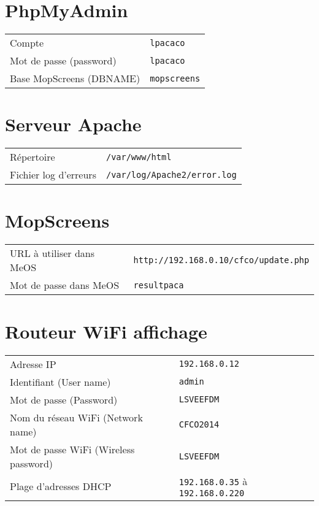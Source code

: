 \documentclass[a4paper]{ffco-rapport}
\begin{document}
\section*{PhpMyAdmin}

\begin{tabular}{l|l}
	Compte & \texttt{lpacaco}\\
	Mot de passe (password) & \texttt{lpacaco}\\
	Base MopScreens (DBNAME) & \texttt{mopscreens}\\
\end{tabular}

\section*{Serveur Apache}

\begin{tabular}{l|l}
	Répertoire & \texttt{/var/www/html}\\
	Fichier log d'erreurs & \texttt{/var/log/Apache2/error.log}\\
\end{tabular}

\section*{MopScreens}

\begin{tabular}{l|l}
	URL à utiliser dans MeOS & \texttt{http://192.168.0.10/cfco/update.php}\\
	Mot de passe dans MeOS & \texttt{resultpaca}\\
\end{tabular}

\section*{Routeur WiFi affichage}

\begin{tabular}{l|l}
	Adresse IP & \texttt{192.168.0.12}\\
	Identifiant (User name) & \texttt{admin}\\
	Mot de passe (Password) & \texttt{LSVEEFDM}\\
	Nom du réseau WiFi (Network name) & \texttt{CFCO2014}\\
	Mot de passe WiFi (Wireless password) & \texttt{LSVEEFDM}\\
	Plage d'adresses DHCP & \texttt{192.168.0.35} à \texttt{192.168.0.220}\\
\end{tabular}
\end{document}
